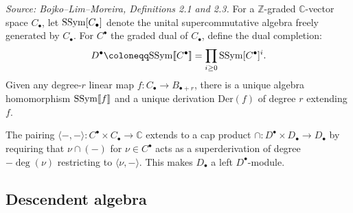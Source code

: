 \begin{definition}[FreeSuperCommAlgebra]
  \label{def:ssym}
  \textit{Source: Bojko--Lim--Moreira, Definitions 2.1 and 2.3.}
  For a \(\mathbb{Z}\)-graded \(\mathbb{C}\)-vector space \(C_\bullet\), let
  \(\mathrm{SSym}[C_\bullet]\) denote the unital supercommutative algebra freely generated
  by \(C_\bullet\). For \(C^\bullet\) the graded dual of \(C_\bullet\), define the
  dual completion:
  \[D^\bullet \coloneqq \SSym\llbracket C^\bullet \rrbracket
    = \prod_{i \geq 0} \SSym[C^\bullet]^i.\]
  Given any degree-\(r\) linear map \(f \colon C_\bullet \to B_{\bullet+r}\), there
  is a unique algebra homomorphism \(\mathrm{SSym}{[\![} f {]\!]}\) and a unique
  derivation \(\mathrm{Der}(f)\) of degree \(r\) extending \(f\).

  The pairing \(\langle -,- \rangle \colon C^\bullet \times C_\bullet \to \mathbb{C}\)
  extends to a cap product
  \(\cap \colon D^\bullet \times D_\bullet \to D_\bullet\)
  by requiring that \(\nu \cap (-)\) for \(\nu \in C^\bullet\) acts as a
  superderivation of degree \(-\deg(\nu)\) restricting to
  \(\langle \nu, - \rangle\). This makes \(D_\bullet\) a left \(D^\bullet\)-module.
\end{definition}

\subsection{Descendent algebra}


